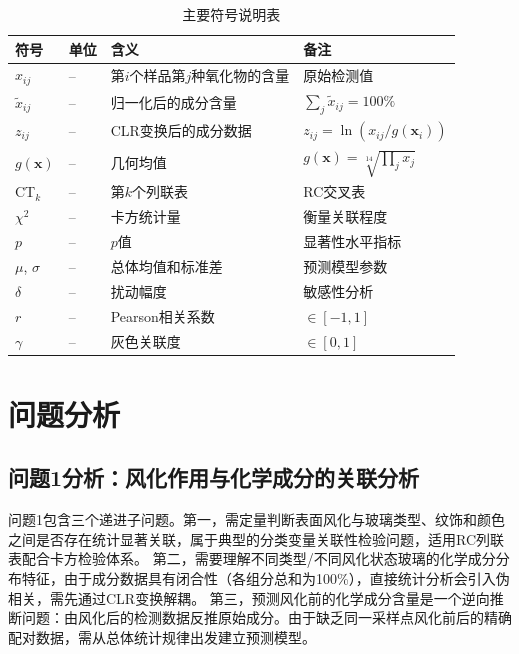 \documentclass[12pt,a4paper]{ctexart}
\begin{document}
\begin{table}[H]
\centering
\caption{主要符号说明表}
\label{tab:symbols}
\begin{tabularx}{\textwidth}{p{2.5cm}p{1.8cm}p{6.5cm}Y}
\toprule
符号 & 单位 & 含义 & 备注 \\
\midrule
$x_{ij}$  & --  & 第$i$个样品第$j$种氧化物的含量 & 原始检测值 \\
$\tilde{x}_{ij}$ & -- & 归一化后的成分含量 & $\sum_j \tilde{x}_{ij}=100\%$ \\
$z_{ij}$  & --  & CLR变换后的成分数据 & $z_{ij}=\ln(x_{ij}/g(\mathbf{x}_i))$ \\
$g(\mathbf{x})$ & -- & 几何均值 & $g(\mathbf{x})=\sqrt[14]{\prod_j x_j}$ \\
CT$_k$ & -- & 第$k$个列联表 & RC交叉表 \\
$\chi^2$ & -- & 卡方统计量 & 衡量关联程度 \\
$p$ & -- & $p$值 & 显著性水平指标 \\
$\mu$, $\sigma$ & -- & 总体均值和标准差 & 预测模型参数 \\
$\delta$ & -- & 扰动幅度 & 敏感性分析 \\
$r$ & -- & Pearson相关系数 & $\in[-1,1]$ \\
$\gamma$ & -- & 灰色关联度 & $\in[0,1]$ \\
\bottomrule
\end{tabularx}
\end{table}

\newpage

\section{问题分析}

\subsection{问题1分析：风化作用与化学成分的关联分析}

问题1包含三个递进子问题。第一，需定量判断表面风化与玻璃类型、纹饰和颜色之间是否存在统计显著关联，属于典型的分类变量关联性检验问题，适用RC列联表配合卡方检验体系。
第二，需要理解不同类型/不同风化状态玻璃的化学成分分布特征，由于成分数据具有闭合性（各组分总和为100\%），直接统计分析会引入伪相关，需先通过CLR变换解耦\cite{2}。
第三，预测风化前的化学成分含量是一个逆向推断问题：由风化后的检测数据反推原始成分。由于缺乏同一采样点风化前后的精确配对数据，需从总体统计规律出发建立预测模型。
\end{document}

